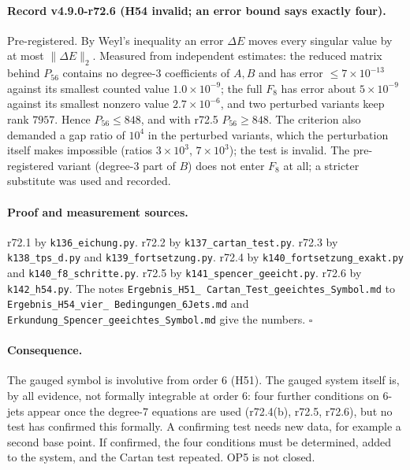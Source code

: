 \paragraph{Record v4.9.0-r72.6 (H54 invalid; an error bound says exactly four).}
Pre-registered.  By Weyl's inequality an error \(\Delta E\) moves every singular value by at most \(\|\Delta E\|_2\).  Measured
from independent estimates: the reduced matrix behind \(P_{56}\) contains no degree-3 coefficients of \(A,B\) and has error
\(\le7\times10^{-13}\) against its smallest counted value \(1.0\times10^{-9}\); the full \(F_8\) has error about
\(5\times10^{-9}\) against its smallest nonzero value \(2.7\times10^{-6}\), and two perturbed variants keep rank \(7957\).
Hence \(P_{56}\le848\), and with r72.5 \(P_{56}\ge848\).  The criterion also demanded a gap ratio of \(10^4\) in the perturbed
variants, which the perturbation itself makes impossible (ratios \(3\times10^3\), \(7\times10^3\)); the test is invalid.  The
pre-registered variant (degree-3 part of \(B\)) does not enter \(F_8\) at all; a stricter substitute was used and recorded.

\paragraph{Proof and measurement sources.}
r72.1 by \texttt{k136\_eichung.py}.  r72.2 by \texttt{k137\_cartan\_test.py}.  r72.3 by \texttt{k138\_tps\_d.py} and
\texttt{k139\_fortsetzung.py}.  r72.4 by \texttt{k140\_fortsetzung\_exakt.py} and \texttt{k140\_f8\_schritte.py}.  r72.5 by
\texttt{k141\_spencer\_geeicht.py}.  r72.6 by \texttt{k142\_h54.py}.  The notes \texttt{Ergebnis\_H51\_\allowbreak
Cartan\_\allowbreak Test\_\allowbreak geeichtes\_\allowbreak Symbol.md} to \texttt{Ergebnis\_H54\_\allowbreak vier\_\allowbreak
Bedingungen\_\allowbreak 6Jets.md} and \texttt{Erkundung\_\allowbreak Spencer\_\allowbreak geeichtes\_\allowbreak Symbol.md}
give the numbers.  \(\square\)

\paragraph{Consequence.}
The gauged symbol is involutive from order 6 (H51).  The gauged system itself is, by all evidence, not formally integrable at
order 6: four further conditions on 6-jets appear once the degree-7 equations are used (r72.4(b), r72.5, r72.6), but no test
has confirmed this formally.  A confirming test needs new data, for example a second base point.  If confirmed, the four
conditions must be determined, added to the system, and the Cartan test repeated.  OP5 is not closed.

